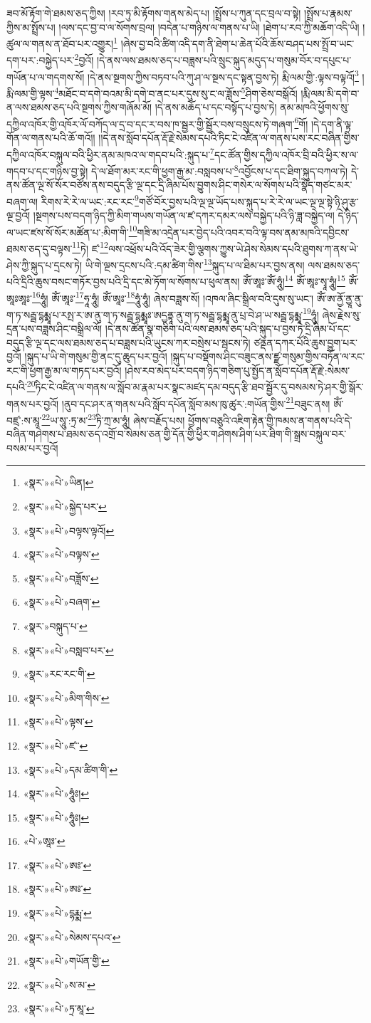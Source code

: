 ཟབ་མོ་རྟོག་གེ་ཐམས་ཅད་ཀྱིས། །རབ་ཏུ་མི་རྟོགས་གནས་མེད་པ། །སྤྲོས་པ་ཀུན་དང་བྲལ་བ་སྟེ། །སྤྲོས་པ་རྣམས་ཀྱིས་མ་སྤྲོས་པ། །ལས་དང་བྱ་བ་ལ་སོགས་བྲལ། །བདེན་པ་གཉིས་ལ་གནས་པ་ཡི། །ཐེག་པ་རབ་ཀྱི་མཆོག་འདི་ཡི། །ཚུལ་ལ་གནས་ན་ཐོབ་པར་འགྱུར།\footnote{«སྣར་»«པེ་»ཡིན།} །ཞེས་བྱ་བའི་ཚིག་འདི་དག་ནི་ཐེག་པ་ཆེན་པོའི་ཆོས་བཤད་པས་སྤྲོ་བ་ཡང་དག་པར་:བསྐྱེད་པར་\footnote{«སྣར་»«པེ་»སྐྱེད་པར་}བྱའོ། །དེ་ནས་ལས་ཐམས་ཅད་པ་བཟླས་པའི་སྲུང་སྐུད་མདུད་པ་གསུམ་བོར་བ་དཔུང་པ་གཡོན་པ་ལ་གདགས་སོ། །དེ་ནས་སྔགས་ཀྱིས་བཏབ་པའི་ཀུ་ཤ་ལ་སྔས་དང་སྟན་བྱས་ཏེ། རྨི་ལམ་གྱི་:ལྟས་བལྟའོ།\footnote{«སྣར་»«པེ་»བལྟས་ལྟའོ།} །རྨི་ལམ་གྱི་ལྟས་\footnote{«སྣར་»«པེ་»བལྟས་}མཐོང་བ་དགེ་བའམ་མི་དགེ་བ་ནང་པར་དུས་སུ་ང་ལ་ཟློས་\footnote{«སྣར་»«པེ་»བཟློས་}ཤིག་ཅེས་བསྒོའོ། །རྨི་ལམ་མི་དགེ་བ་ན་ལས་ཐམས་ཅད་པའི་སྔགས་ཀྱིས་གཞོམ་མོ། །དེ་ནས་མཆོད་པ་དང་བསྟོད་པ་བྱས་ཏེ། ནམ་མཁའི་ཕྱོགས་སུ་དཀྱིལ་འཁོར་གྱི་འཁོར་ལོ་བཀོད་ལ་དྲ་བ་དང་ར་བས་ཁ་སྦྱར་གྱི་སྦྱོར་བས་བསྲུངས་ཏེ་གཞག་\footnote{«སྣར་»«པེ་»བཞག་}གོ། །དེ་དག་ནི་ལྟ་གོན་ལ་གནས་པའི་ཆོ་གའོ།། །།དེ་ནས་སློབ་དཔོན་རྡོ་རྗེ་སེམས་དཔའི་ཏིང་ངེ་འཛིན་ལ་གནས་པས་རང་བཞིན་གྱིས་དཀྱིལ་འཁོར་བསྐུལ་བའི་ཕྱིར་ནམ་མཁའ་ལ་གདབ་པའི་:སྐུད་པ་\footnote{«སྣར་»བསྐུད་པ་}དང་ཚོན་གྱིས་དཀྱིལ་འཁོར་བྲི་བའི་ཕྱིར་ས་ལ་གདབ་པ་དང་གཉིས་བྱ་སྟེ། དེ་ལ་ཐོག་མར་རང་གི་ཕྱག་རྒྱ་མ་:བསླབས་པ་\footnote{«སྣར་»«པེ་»བསླབ་པར་}འབྱོངས་པ་དང་ཐིག་སྐུད་བཀལ་ཏེ། དེ་ནས་ཚོན་ལྔ་སོ་སོར་བཙོས་ནས་བདུད་རྩི་ལྔ་དང་དྲི་ཞིམ་པོས་བྱུགས་ཤིང་གསེར་ལ་སོགས་པའི་སྣོད་གཙང་མར་བཞག་ལ། རིགས་རེ་རེ་ལ་ཡང་:རང་རང་\footnote{«སྣར་»རང་རང་གི་}གཙོ་བོར་བྱས་པའི་ལྔ་ལྔ་ཡོད་པས་སྐུད་པ་རེ་རེ་ལ་ཡང་ལྔ་ལྔ་སྟེ་ཉི་ཤུ་རྩ་ལྔ་བྱའོ། །སྔགས་པས་བདག་ཉིད་ཀྱི་མིག་གཡས་གཡོན་ལ་ཛ་དཀར་དམར་ལས་བསྐྱེད་པའི་ཉི་ཟླ་བསྐྱེད་ལ། དེ་ཉིད་ལ་ཡང་ཛས་སོ་སོར་མཚོན་པ་:མིག་གི་\footnote{«སྣར་»«པེ་»མིག་གིས་}གཟི་མ་འདྲེན་པར་བྱེད་པའི་འབར་བའི་ལྟ་བས་ནམ་མཁའི་དབྱིངས་ཐམས་ཅད་དུ་བལྟས་\footnote{«སྣར་»«པེ་»ལྟས་}ཏེ། ཛ་\footnote{«སྣར་»«པེ་»ཛ་་}ལས་འཕྲོས་པའི་འོད་ཟེར་གྱི་ལྕགས་ཀྱུས་ཡེ་ཤེས་སེམས་དཔའི་ཐུགས་ཀ་ནས་ཡེ་ཤེས་ཀྱི་སྐུད་པ་དྲངས་ཏེ། ཡི་གེ་ལྔས་དྲངས་པའི་:དམ་ཚིག་གིས་\footnote{«སྣར་»«པེ་»དམ་ཚིག་གི་}སྐུད་པ་ལ་ཐིམ་པར་བྱས་ནས། ལས་ཐམས་ཅད་པའི་དྲིའི་ཆུས་བསང་གཏོར་བྱས་པའི་དྲི་དང་མེ་ཏོག་ལ་སོགས་པ་ཕུལ་ནས། ཨོཾ་ཨཱཿ་ཨོཾ་ཧཱུཾ།\footnote{«སྣར་»«པེ་»ཧཱུཾཿ།} ཨོཾ་ཨཱཿ་སྭཱ་ཧཱུཾ།\footnote{«སྣར་»«པེ་»ཧཱུཾཿ།} ཨོཾ་ཨཱཿཨཱཿ་\footnote{«པེ་»ཨཱཿ་}ཧཱུཾ། ཨོཾ་ཨཱཿ་\footnote{«སྣར་»«པེ་»ཨཿ་}ཧཱ་ཧཱུཾ། ཨོཾ་ཨཱཿ་\footnote{«སྣར་»«པེ་»ཨཿ་}ཧཱུཾ་ཧཱུཾ། ཞེས་བཟླས་སོ། །འཁལ་ཞིང་སྒྲིལ་བའི་དུས་སུ་ཡང་། ཨོཾ་ཨ་ནྱོ་ནྱཱ་ནུ་ག་ཏ་སརྦྦ་དྷརྨྨཱ་པ་རསྤ་ར་ཨ་ནུ་ག་ཏ་སརྦྦ་དྷརྨྨཱཿ་ཨདྱནྟཱ་ནུ་ག་ཏ་སརྦྦ་དྷརྨྨཱ་ནུ་པྲ་བེ་ཤ་ཡ་སརྦྦ་དྷརྨྨཱ་\footnote{«སྣར་»«པེ་»དྷརྨྨ་}ཧཱུཾ། ཞེས་རྗེས་སུ་དྲན་པས་བཟླས་ཤིང་བསྒྲིལ་ལོ། །དེ་ནས་ཚོན་སྣ་གཅིག་པའི་ལས་ཐམས་ཅད་པའི་སྐུད་པ་བྱས་ཏེ་དྲི་ཞིམ་པོ་དང་བདུད་རྩི་ལྔ་དང་ལས་ཐམས་ཅད་པ་བཟླས་པའི་ཡུངས་ཀར་བསྲེས་པ་སྦངས་ཏེ། ཙནྡན་དཀར་པོའི་ཆུས་བྱུག་པར་བྱའོ། །སྐུད་པ་ཡི་གེ་གསུམ་གྱི་ནང་དུ་ཆུད་པར་བྱའོ། །སྐུད་པ་བསྡོགས་ཤིང་བཟུང་ནས་ཛྫ་གསུམ་གྱིས་བཏོན་ལ་རང་རང་གི་ཕྱག་རྒྱ་མ་ལ་གཏད་པར་བྱའོ། །ཤེས་རབ་མེད་པར་བདག་ཉིད་གཅིག་པུ་སྤྱོད་ན་སློབ་དཔོན་རྡོ་རྗེ་:སེམས་དཔའི་\footnote{«སྣར་»«པེ་»སེམས་དཔའ་}ཏིང་ངེ་འཛིན་ལ་གནས་ལ་སློབ་མ་རྣམ་པར་སྣང་མཛད་དམ་བདུད་རྩི་ཐབ་སྦྱོར་དུ་བསམས་ཏེ་ཤར་གྱི་སྒོར་གནས་པར་བྱའོ། །ནུབ་དང་ཤར་ན་གནས་པའི་སློབ་དཔོན་སློབ་མས་ཁུ་ཚུར་:གཡོན་གྱིས་\footnote{«སྣར་»«པེ་»གཡོན་གྱི་}བཟུང་ནས། ཨོཾ་བཛྲ་:ས་མཱ་\footnote{«སྣར་»«པེ་»ས་མ་}ཡ་སཱུ་:ཏྲ་མ་\footnote{«སྣར་»«པེ་»ཏྲ་མཱ་}ཏི་ཀྲ་མ་ཧཱུཾ། ཞེས་བརྗོད་པས། ཕྱོགས་བཅུའི་འཇིག་རྟེན་གྱི་ཁམས་ན་གནས་པའི་དེ་བཞིན་གཤེགས་པ་ཐམས་ཅད་འགྲོ་བ་སེམས་ཅན་གྱི་དོན་གྱི་ཕྱིར་གཤེགས་ཤིག་པར་ཐིག་གི་སྒྲས་བསྐུལ་བར་བསམ་པར་བྱའོ། 